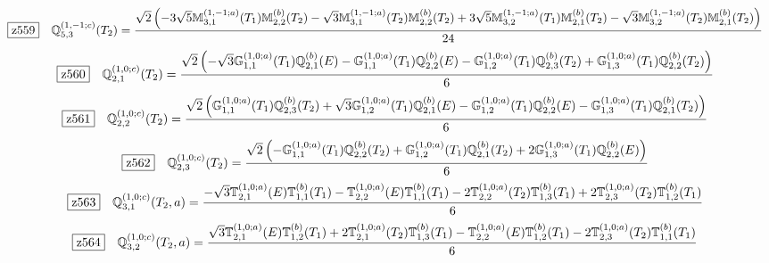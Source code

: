 \documentclass[fleqn,10pt,landscape]{jsarticle}
\begin{document}
\begin{dmath*}
\hspace*{3mm}\fbox{z559}\quad \mathbb{Q}_{5,3}^{(1,-1;c)}(T_{2})=\frac{\sqrt{2} \left(- 3 \sqrt{5} \mathbb{M}_{3,1}^{(1,-1;a)}(T_{1}) \mathbb{M}_{2,2}^{(b)}(T_{2}) - \sqrt{3} \mathbb{M}_{3,1}^{(1,-1;a)}(T_{2}) \mathbb{M}_{2,2}^{(b)}(T_{2}) + 3 \sqrt{5} \mathbb{M}_{3,2}^{(1,-1;a)}(T_{1}) \mathbb{M}_{2,1}^{(b)}(T_{2}) - \sqrt{3} \mathbb{M}_{3,2}^{(1,-1;a)}(T_{2}) \mathbb{M}_{2,1}^{(b)}(T_{2})\right)}{24}
\end{dmath*}
\begin{dmath*}
\hspace*{3mm}\fbox{z560}\quad \mathbb{Q}_{2,1}^{(1,0;c)}(T_{2})=\frac{\sqrt{2} \left(- \sqrt{3} \mathbb{G}_{1,1}^{(1,0;a)}(T_{1}) \mathbb{Q}_{2,1}^{(b)}(E) - \mathbb{G}_{1,1}^{(1,0;a)}(T_{1}) \mathbb{Q}_{2,2}^{(b)}(E) - \mathbb{G}_{1,2}^{(1,0;a)}(T_{1}) \mathbb{Q}_{2,3}^{(b)}(T_{2}) + \mathbb{G}_{1,3}^{(1,0;a)}(T_{1}) \mathbb{Q}_{2,2}^{(b)}(T_{2})\right)}{6}
\end{dmath*}
\begin{dmath*}
\hspace*{3mm}\fbox{z561}\quad \mathbb{Q}_{2,2}^{(1,0;c)}(T_{2})=\frac{\sqrt{2} \left(\mathbb{G}_{1,1}^{(1,0;a)}(T_{1}) \mathbb{Q}_{2,3}^{(b)}(T_{2}) + \sqrt{3} \mathbb{G}_{1,2}^{(1,0;a)}(T_{1}) \mathbb{Q}_{2,1}^{(b)}(E) - \mathbb{G}_{1,2}^{(1,0;a)}(T_{1}) \mathbb{Q}_{2,2}^{(b)}(E) - \mathbb{G}_{1,3}^{(1,0;a)}(T_{1}) \mathbb{Q}_{2,1}^{(b)}(T_{2})\right)}{6}
\end{dmath*}
\begin{dmath*}
\hspace*{3mm}\fbox{z562}\quad \mathbb{Q}_{2,3}^{(1,0;c)}(T_{2})=\frac{\sqrt{2} \left(- \mathbb{G}_{1,1}^{(1,0;a)}(T_{1}) \mathbb{Q}_{2,2}^{(b)}(T_{2}) + \mathbb{G}_{1,2}^{(1,0;a)}(T_{1}) \mathbb{Q}_{2,1}^{(b)}(T_{2}) + 2 \mathbb{G}_{1,3}^{(1,0;a)}(T_{1}) \mathbb{Q}_{2,2}^{(b)}(E)\right)}{6}
\end{dmath*}
\begin{dmath*}
\hspace*{3mm}\fbox{z563}\quad \mathbb{Q}_{3,1}^{(1,0;c)}(T_{2},a)=\frac{- \sqrt{3} \mathbb{T}_{2,1}^{(1,0;a)}(E) \mathbb{T}_{1,1}^{(b)}(T_{1}) - \mathbb{T}_{2,2}^{(1,0;a)}(E) \mathbb{T}_{1,1}^{(b)}(T_{1}) - 2 \mathbb{T}_{2,2}^{(1,0;a)}(T_{2}) \mathbb{T}_{1,3}^{(b)}(T_{1}) + 2 \mathbb{T}_{2,3}^{(1,0;a)}(T_{2}) \mathbb{T}_{1,2}^{(b)}(T_{1})}{6}
\end{dmath*}
\begin{dmath*}
\hspace*{3mm}\fbox{z564}\quad \mathbb{Q}_{3,2}^{(1,0;c)}(T_{2},a)=\frac{\sqrt{3} \mathbb{T}_{2,1}^{(1,0;a)}(E) \mathbb{T}_{1,2}^{(b)}(T_{1}) + 2 \mathbb{T}_{2,1}^{(1,0;a)}(T_{2}) \mathbb{T}_{1,3}^{(b)}(T_{1}) - \mathbb{T}_{2,2}^{(1,0;a)}(E) \mathbb{T}_{1,2}^{(b)}(T_{1}) - 2 \mathbb{T}_{2,3}^{(1,0;a)}(T_{2}) \mathbb{T}_{1,1}^{(b)}(T_{1})}{6}
\end{dmath*}
\end{document}
